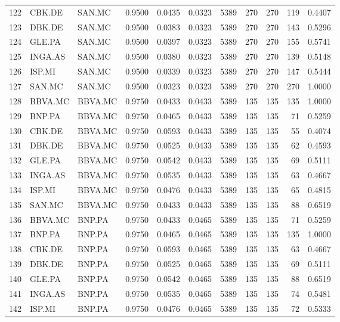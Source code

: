 \begin{table}
\begin{tabular}{lllrrrrrrrr}
122 & CBK.DE & SAN.MC & 0.9500 & 0.0435 & 0.0323 & 5389 & 270 & 270 & 119 & 0.4407 \\
123 & DBK.DE & SAN.MC & 0.9500 & 0.0383 & 0.0323 & 5389 & 270 & 270 & 143 & 0.5296 \\
124 & GLE.PA & SAN.MC & 0.9500 & 0.0397 & 0.0323 & 5389 & 270 & 270 & 155 & 0.5741 \\
125 & INGA.AS & SAN.MC & 0.9500 & 0.0380 & 0.0323 & 5389 & 270 & 270 & 139 & 0.5148 \\
126 & ISP.MI & SAN.MC & 0.9500 & 0.0339 & 0.0323 & 5389 & 270 & 270 & 147 & 0.5444 \\
127 & SAN.MC & SAN.MC & 0.9500 & 0.0323 & 0.0323 & 5389 & 270 & 270 & 270 & 1.0000 \\
128 & BBVA.MC & BBVA.MC & 0.9750 & 0.0433 & 0.0433 & 5389 & 135 & 135 & 135 & 1.0000 \\
129 & BNP.PA & BBVA.MC & 0.9750 & 0.0465 & 0.0433 & 5389 & 135 & 135 & 71 & 0.5259 \\
130 & CBK.DE & BBVA.MC & 0.9750 & 0.0593 & 0.0433 & 5389 & 135 & 135 & 55 & 0.4074 \\
131 & DBK.DE & BBVA.MC & 0.9750 & 0.0525 & 0.0433 & 5389 & 135 & 135 & 62 & 0.4593 \\
132 & GLE.PA & BBVA.MC & 0.9750 & 0.0542 & 0.0433 & 5389 & 135 & 135 & 69 & 0.5111 \\
133 & INGA.AS & BBVA.MC & 0.9750 & 0.0535 & 0.0433 & 5389 & 135 & 135 & 63 & 0.4667 \\
134 & ISP.MI & BBVA.MC & 0.9750 & 0.0476 & 0.0433 & 5389 & 135 & 135 & 65 & 0.4815 \\
135 & SAN.MC & BBVA.MC & 0.9750 & 0.0433 & 0.0433 & 5389 & 135 & 135 & 88 & 0.6519 \\
136 & BBVA.MC & BNP.PA & 0.9750 & 0.0433 & 0.0465 & 5389 & 135 & 135 & 71 & 0.5259 \\
137 & BNP.PA & BNP.PA & 0.9750 & 0.0465 & 0.0465 & 5389 & 135 & 135 & 135 & 1.0000 \\
138 & CBK.DE & BNP.PA & 0.9750 & 0.0593 & 0.0465 & 5389 & 135 & 135 & 63 & 0.4667 \\
139 & DBK.DE & BNP.PA & 0.9750 & 0.0525 & 0.0465 & 5389 & 135 & 135 & 69 & 0.5111 \\
140 & GLE.PA & BNP.PA & 0.9750 & 0.0542 & 0.0465 & 5389 & 135 & 135 & 88 & 0.6519 \\
141 & INGA.AS & BNP.PA & 0.9750 & 0.0535 & 0.0465 & 5389 & 135 & 135 & 74 & 0.5481 \\
142 & ISP.MI & BNP.PA & 0.9750 & 0.0476 & 0.0465 & 5389 & 135 & 135 & 72 & 0.5333 \\

\end{tabular}
\end{table}
